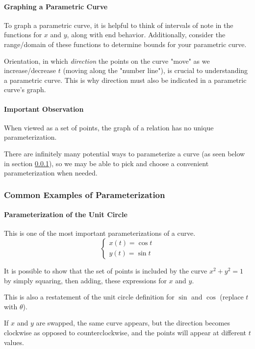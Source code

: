 \documentclass{article}
\begin{document}
\paragraph{Graphing a Parametric Curve}
To graph a parametric curve, it is helpful to think of intervals of note in the functions for $x$ and $y$, along with end behavior. Additionally, consider the range/domain of these functions to determine bounds for your parametric curve.

Orientation, in which \emph{direction} the points on the curve "move" as we increase/decrease $t$ (moving along the "number line"), is crucial to understanding a parametric curve. This is why direction must also be indicated in a parametric curve's graph.

\paragraph{Important Observation}
When viewed as a set of points, the graph of a relation has no unique parameterization.

There are infinitely many potential ways to parameterize a curve (as seen below in section \ref{param-examples}), so we may be able to pick and choose a convenient parameterization when needed.

\subsubsection{Common Examples of Parameterization} \label{param-examples}
\paragraph{Parameterization of the Unit Circle}
This is one of the most important parameterizations of a curve.
\[
    \begin{cases}
        x(t) = \cos t \\
        y(t) = \sin t
    \end{cases}
\]

It is possible to show that the set of points is included by the curve $x^2 + y^2 = 1$ by simply squaring, then adding, these expressions for $x$ and $y$.

This is also a restatement of the unit circle definition for $\sin$ and $\cos$ (replace $t$ with $\theta$).

If $x$ and $y$ are swapped, the same curve appears, but the direction becomes clockwise as opposed to counterclockwise, and the points will appear at different $t$ values.
\end{document}
